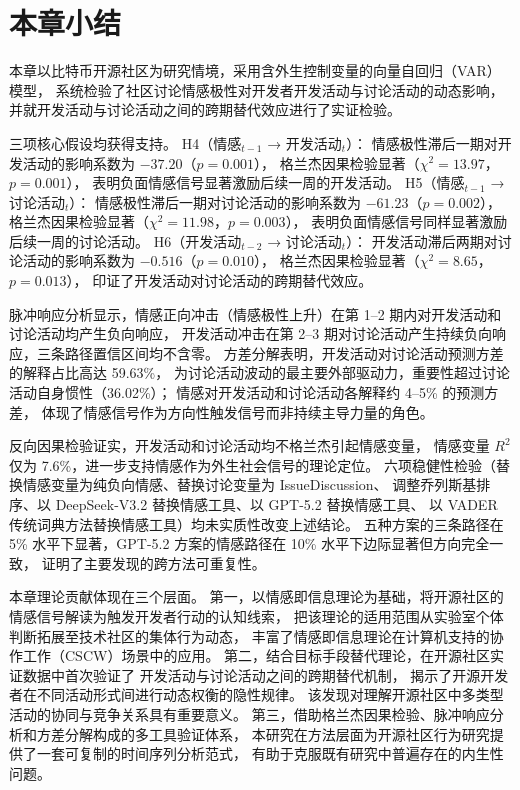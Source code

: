 \documentclass[
    type = master, %
    degree = professional,        %
    decl-page,  %
    twoside,                %
    fontset = fandol %
  ]{njuthesis}
\begin{document}
\section{本章小结}

本章以比特币开源社区为研究情境，采用含外生控制变量的向量自回归（VAR）模型，
系统检验了社区讨论情感极性对开发者开发活动与讨论活动的动态影响，
并就开发活动与讨论活动之间的跨期替代效应进行了实证检验。

三项核心假设均获得支持。
H4（情感$_{t-1}$ → 开发活动$_t$）：
情感极性滞后一期对开发活动的影响系数为 $-37.20$（$p = 0.001$），
格兰杰因果检验显著（$\chi^2 = 13.97$，$p = 0.001$），
表明负面情感信号显著激励后续一周的开发活动。
H5（情感$_{t-1}$ → 讨论活动$_t$）：
情感极性滞后一期对讨论活动的影响系数为 $-61.23$（$p = 0.002$），
格兰杰因果检验显著（$\chi^2 = 11.98$，$p = 0.003$），
表明负面情感信号同样显著激励后续一周的讨论活动。
H6（开发活动$_{t-2}$ → 讨论活动$_t$）：
开发活动滞后两期对讨论活动的影响系数为 $-0.516$（$p = 0.010$），
格兰杰因果检验显著（$\chi^2 = 8.65$，$p = 0.013$），
印证了开发活动对讨论活动的跨期替代效应。

脉冲响应分析显示，情感正向冲击（情感极性上升）在第 1--2 期内对开发活动和讨论活动均产生负向响应，
开发活动冲击在第 2--3 期对讨论活动产生持续负向响应，三条路径置信区间均不含零。
方差分解表明，开发活动对讨论活动预测方差的解释占比高达 59.63\%，
为讨论活动波动的最主要外部驱动力，重要性超过讨论活动自身惯性（36.02\%）；
情感对开发活动和讨论活动各解释约 4--5\% 的预测方差，
体现了情感信号作为方向性触发信号而非持续主导力量的角色。

反向因果检验证实，开发活动和讨论活动均不格兰杰引起情感变量，
情感变量 $R^2$ 仅为 7.6\%，进一步支持情感作为外生社会信号的理论定位。
六项稳健性检验（替换情感变量为纯负向情感、替换讨论变量为 IssueDiscussion、
调整乔列斯基排序、以 DeepSeek-V3.2 替换情感工具、以 GPT-5.2 替换情感工具、
以 VADER 传统词典方法替换情感工具）均未实质性改变上述结论。
五种方案的三条路径在 5\% 水平下显著，GPT-5.2 方案的情感路径在 10\% 水平下边际显著但方向完全一致，
证明了主要发现的跨方法可重复性。

本章理论贡献体现在三个层面。
第一，以情感即信息理论为基础，将开源社区的情感信号解读为触发开发者行动的认知线索，
把该理论的适用范围从实验室个体判断拓展至技术社区的集体行为动态，
丰富了情感即信息理论在计算机支持的协作工作（CSCW）场景中的应用。
第二，结合目标手段替代理论，在开源社区实证数据中首次验证了
开发活动与讨论活动之间的跨期替代机制，
揭示了开源开发者在不同活动形式间进行动态权衡的隐性规律。
该发现对理解开源社区中多类型活动的协同与竞争关系具有重要意义。
第三，借助格兰杰因果检验、脉冲响应分析和方差分解构成的多工具验证体系，
本研究在方法层面为开源社区行为研究提供了一套可复制的时间序列分析范式，
有助于克服既有研究中普遍存在的内生性问题。
\end{document}
